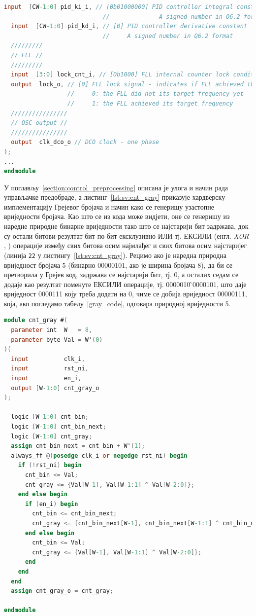 \documentclass[master]{finthesis}
\makeatletter
\newcommand*{\engl}[2][\@empty]{%
    \edef\theacronym{#1}%
    (енгл. \foreignlanguage{english}{\emph{#2}%
    \ifx\theacronym\@empty \else , #1\fi})%
}
\newcommand*{\prog}[1]{\texttt{#1}}
\def \FLL  {FLL} %
\makeatother
\begin{document}
\begin{lstlisting}[language=Verilog, caption={Улазни и излазни сигнали (интерфејс) хијерархијски највишег \FLL\ модула.}, label={lst:sv:fll_input}]
  input  [CW-1:0] pid_ki_i, // [0b01000000] PID controller integral constant
                            //              A signed number in Q6.2 format (0b010000_00 == 0d16)
  input  [CW-1:0] pid_kd_i, // [0] PID controller derivative constant
                            //     A signed number in Q6.2 format
  /////////
  // FLL //
  /////////
  input  [3:0] lock_cnt_i, // [0b1000] FLL internal counter lock condition threshold
  output  lock_o, // [0] FLL lock signal - indicates if FLL achieved the target frequency
                  //     0: the FLL did not its target frequency yet
                  //     1: the FLL achieved its target frequency
  ////////////////
  // OSC output //
  ////////////////
  output  clk_dco_o // DCO clock - one phase
);
...
endmodule
\end{lstlisting}
У поглављу~\ref{section:control_preprocessing} описана је улога и начин рада управљачке предобраде, а листинг~\ref{lst:sv:cnt_gray} приказује хардверску имплементацију Грејевог бројача и начин како се генеришу узастопне вриједности бројача. Као што се из кода може видјети, оне се генеришу из наредне природне бинарне вриједности тако што се најстарији бит задржава, док су остали битови резултат бит по бит ексклузивно ИЛИ тј. ЕКСИЛИ \engl{XOR} операције између свих битова осим најмлађег и свих битова осим најстаријег (линија \prog{22} у листингу~\ref{lst:sv:cnt_gray}). Рецимо ако је наредна природна вриједност бројача 5 (бинарно 00000101, ако је ширина бројача 8), да би се претворила у Грејев код, задржава се најстарији бит, тј. 0, а осталих седам се додаје као резултат поменуте ЕКСИЛИ операције, тј. 0000010\,\^\,0000101, што даје вриједност 0000111 коју треба додати на 0, чиме се добија вриједност 00000111, која, ако погледамо табелу~\ref{gray_code}, одговара природној вриједности 5. \par
\begin{lstlisting}[language=Verilog, caption={Модул Грејевог бројача.}, label={lst:sv:cnt_gray}]
module cnt_gray #(
  parameter int  W   = 8,
  parameter byte Val = W'(0)
)(
  input          clk_i,
  input          rst_ni,
  input          en_i,
  output [W-1:0] cnt_gray_o
);

  logic [W-1:0] cnt_bin;
  logic [W-1:0] cnt_bin_next;
  logic [W-1:0] cnt_gray;
  assign cnt_bin_next = cnt_bin + W'(1);
  always_ff @(posedge clk_i or negedge rst_ni) begin
    if (!rst_ni) begin
      cnt_bin <= Val;
      cnt_gray <= {Val[W-1], Val[W-1:1] ^ Val[W-2:0]};
    end else begin
      if (en_i) begin
        cnt_bin <= cnt_bin_next;
        cnt_gray <= {cnt_bin_next[W-1], cnt_bin_next[W-1:1] ^ cnt_bin_next[W-2:0]};
      end else begin
        cnt_bin <= Val;
        cnt_gray <= {Val[W-1], Val[W-1:1] ^ Val[W-2:0]};
      end
    end
  end
  assign cnt_gray_o = cnt_gray;

endmodule
\end{lstlisting}
\end{document}
